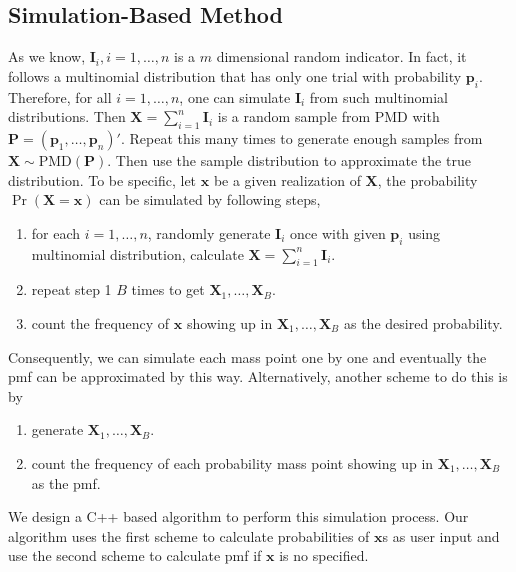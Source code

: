 \documentclass[12pt]{article}
\newcommand{\Ivec}{{\boldsymbol{I}}}
\newcommand{\Pmat}{\mathbf{P}}
\newcommand{\pvec}{\boldsymbol{p}}
\newcommand{\PMD}{\textrm{PMD}}
\newcommand{\Xvec}{\boldsymbol{X}}
\newcommand{\xvec}{\boldsymbol{x}}
\begin{document}
\subsection{Simulation-Based Method}
As we know, $\Ivec_i, i=1,\dots,n$ is a $m$ dimensional random indicator. In fact, it follows a multinomial distribution that has only one trial with probability $\pvec_i$. Therefore, for all $i=1,\dots, n$, one can simulate $\Ivec_i$ from such multinomial distributions. Then $\Xvec = \sum_{i=1}^{n}\Ivec_i$ is a random sample from $\PMD$ with $\Pmat = (\pvec_1, \dots,\pvec_n)'$. Repeat this many times to generate enough samples from $\Xvec \sim \PMD(\Pmat)$. Then use the sample distribution to approximate the true distribution. To be specific, let $\xvec$ be a given realization of $\Xvec$, the probability $\Pr(\Xvec=\xvec)$ can be simulated by following steps,
\begin{enumerate}[Step 1]
    \item for each $i=1,\dots,n$,  randomly generate $\Ivec_i$ once with given $\pvec_i$ using multinomial distribution, calculate $\Xvec = \sum_{i=1}^{n}\Ivec_i$.
    \item repeat step 1 $B$ times to get $\Xvec_{1},\dots,\Xvec_{B}.$
    \item count the frequency of $\xvec$ showing up in $\Xvec_{1},\dots,\Xvec_{B}$ as the desired probability.
\end{enumerate}
Consequently, we can simulate each mass point one by one and eventually the pmf can be approximated by this way. Alternatively, another scheme to do this is by
\begin{enumerate}[Step 1]
	\item generate $\Xvec_{1},\dots,\Xvec_{B}$.
	\item count the frequency of each probability mass point showing up in $\Xvec_{1},\dots,\Xvec_{B}$ as the pmf.
\end{enumerate}

We design a C++ based algorithm to perform this simulation process. Our algorithm uses the first scheme to calculate probabilities of $\xvec$s as user input  and use the second scheme to calculate pmf if $\xvec$ is no specified.
\end{document}
